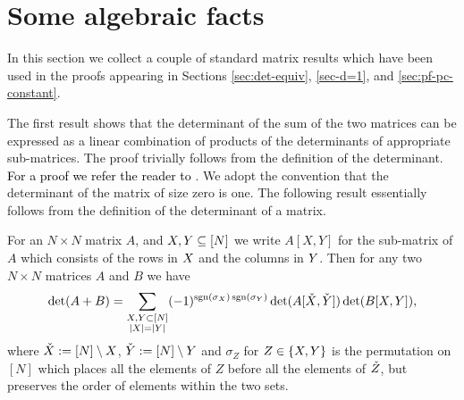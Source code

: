 \documentclass{amsart}
\numberwithin{equation}{section}
\def\corAB{}
\def\corOZ{}
\def\corABrev{\textcolor{black}}
\begin{document}
\appendix
\section{Some algebraic facts}
\label{sec:prelim}
\corAB{In this section we collect a couple of standard matrix results which have been used in the proofs appearing in Sections \ref{sec:det-equiv}, \ref{sec-d=1}, and \ref{sec:pf-pc-constant}.}

\corAB{The first result shows that the determinant of the sum of the two matrices can be expressed as a linear combination of products of the determinants of appropriate sub-matrices. The proof trivially follows from the definition of the determinant. \corABrev{For a proof we refer the reader to \cite{marcus}}.} \corOZ{We adopt the convention that} the determinant of the matrix of size zero is one. The following result essentially follows from the definition of the determinant of a matrix.
\begin{lemma}\label{lem:cauchy-binet}
\corAB{For an $N\times N$ matrix $A$, and $X,Y\subseteq [N]$ we write $A[X,Y]$ for the sub-matrix of $A$ which consists of the rows in $X$ and the columns in $Y$. Then for any two $N\times N$ matrices $A$ and $B$ we have}
\begin{equation}\label{eq:det_decomposition}
        \det(A+B) = \sum_{\substack{X,Y \subset [N] \\ |X|=|Y|}} (-1)^{\operatorname{sgn}(\sigma_X)\operatorname{sgn}(\sigma_Y)} \det(A[\check{X}, \check{Y}])\det(B[X, Y]),
\end{equation}
where $\check{X}:=[N]\setminus X$, $\check{Y}:=[N] \setminus Y$ and $\sigma_Z$ for $Z\in\{X,Y\}$ is the permutation on $[N]$ which places all the elements of $Z$ before all the elements of $\check{Z}$, but preserves the order of elements within the two sets.
\end{lemma}

\end{document}
